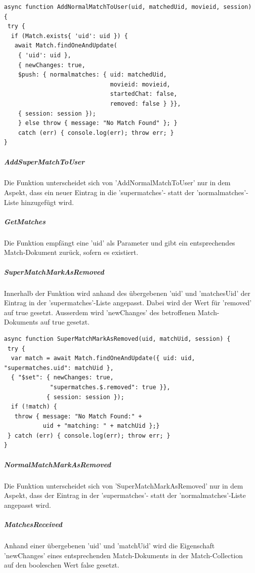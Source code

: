 \begin{lstlisting}[caption=Match Service - AddNormalMatchToUser, label=lst:matchserviceAddNormalMatchToUser]
async function AddNormalMatchToUser(uid, matchedUid, movieid, session) {
 try {
  if (Match.exists{ 'uid': uid }) {
   await Match.findOneAndUpdate(
    { 'uid': uid },
    { newChanges: true,
    $push: { normalmatches: { uid: matchedUid, 
                              movieid: movieid, 
                              startedChat: false, 
                              removed: false } }},
    { session: session });
    } else throw { message: "No Match Found" }; }
    catch (err) { console.log(err); throw err; }
}
\end{lstlisting}

\noindent
\subparagraph{AddSuperMatchToUser}
Die Funktion unterscheidet sich von 'AddNormalMatchToUser' nur in dem Aspekt, dass ein neuer Eintrag in die 'supermatches'- statt der 'normalmatches'-Liste hinzugefügt wird.

\noindent
\subparagraph{GetMatches}
Die Funktion empfängt eine 'uid' als Parameter und gibt ein entsprechendes Match-Dokument zurück, sofern es existiert.

\noindent
\subparagraph{SuperMatchMarkAsRemoved}
Innerhalb der Funktion wird anhand des übergebenen 'uid' und 'matchesUid' der Eintrag in der 'supermatches'-Liste angepasst. Dabei wird der Wert für 'removed' auf true gesetzt. Ausserdem wird 'newChanges' des betroffenen Match-Dokuments auf true gesetzt.

\begin{lstlisting}[caption=Match Service - SuperMatchMarkAsRemoved, label=lst:matchserviceSuperMatchMarkAsRemoved]
async function SuperMatchMarkAsRemoved(uid, matchUid, session) {
 try {
  var match = await Match.findOneAndUpdate({ uid: uid, "supermatches.uid": matchUid },
  { "$set": { newChanges: true,
             "supermatches.$.removed": true }},
            { session: session });
  if (!match) {
   throw { message: "No Match Found:" + 
           uid + "matching: " + matchUid };}
 } catch (err) { console.log(err); throw err; }
}
\end{lstlisting}

\noindent
\subparagraph{NormalMatchMarkAsRemoved}
Die Funktion unterscheidet sich von 'SuperMatchMarkAsRemoved' nur in dem Aspekt, dass der  Eintrag in der 'supermatches'- statt der 'normalmatches'-Liste angepasst wird.

\noindent
\subparagraph{MatchesReceived}
Anhand einer übergebenen 'uid' und 'matchUid' wird die Eigenschaft 'newChanges' eines entsprechenden Match-Dokuments in der Match-Collection auf den booleschen Wert false gesetzt. 



